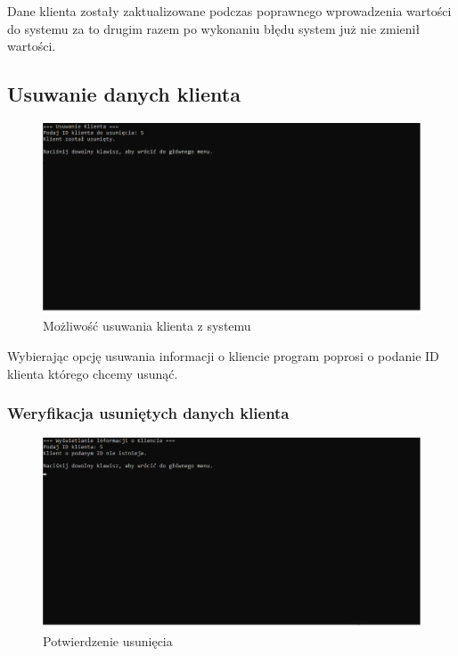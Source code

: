 Dane klienta zostały zaktualizowane podczas poprawnego wprowadzenia wartości do systemu za to drugim razem po wykonaniu błędu system już nie zmienił wartości. 

\subsection{Usuwanie danych klienta}

\begin{figure}[h]
    \centering
    \includegraphics[width=\textwidth]{UsuwanieKlienta.png}
      \caption{Możliwość usuwania klienta z systemu}
    \label{fig:example}
\end{figure}

Wybierając opcję usuwania informacji o kliencie program poprosi o podanie ID klienta którego chcemy usunąć.

\subsubsection{Weryfikacja usuniętych danych klienta}
\begin{figure}[h]
    \centering
    \includegraphics[width=\textwidth]{PotwierdzenieUsu.png}
      \caption{Potwierdzenie usunięcia}
    \label{fig:example}
\end{figure}

